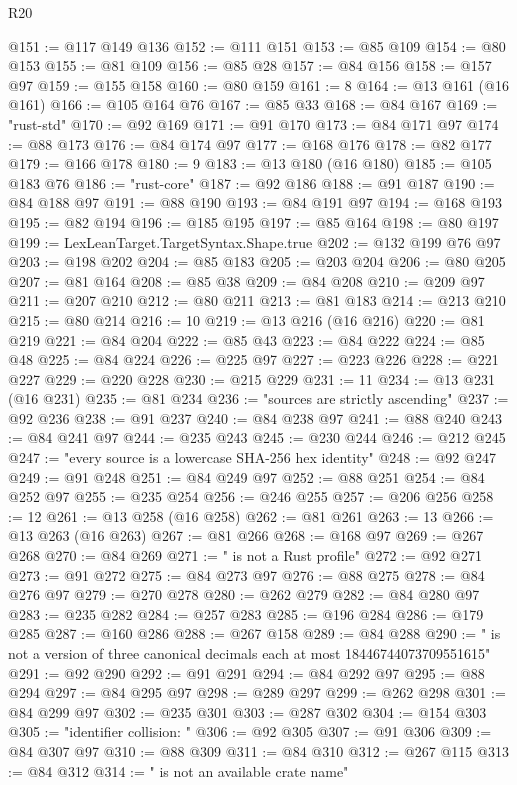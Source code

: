 \begin{lexlean}{R20}
\begin{coremodule}
@151 := @117 @149 @136
@152 := @111 @151
@153 := @85 @109
@154 := @80 @153
@155 := @81 @109
@156 := @85 @28
@157 := @84 @156
@158 := @157 @97
@159 := @155 @158
@160 := @80 @159
@161 := 8
@164 := @13 @161 (@16 @161)
@166 := @105 @164 @76
@167 := @85 @33
@168 := @84 @167
@169 := "rust-std"
@170 := @92 @169
@171 := @91 @170
@173 := @84 @171 @97
@174 := @88 @173
@176 := @84 @174 @97
@177 := @168 @176
@178 := @82 @177
@179 := @166 @178
@180 := 9
@183 := @13 @180 (@16 @180)
@185 := @105 @183 @76
@186 := "rust-core"
@187 := @92 @186
@188 := @91 @187
@190 := @84 @188 @97
@191 := @88 @190
@193 := @84 @191 @97
@194 := @168 @193
@195 := @82 @194
@196 := @185 @195
@197 := @85 @164
@198 := @80 @197
@199 := LexLeanTarget.TargetSyntax.Shape.true
@202 := @132 @199 @76 @97
@203 := @198 @202
@204 := @85 @183
@205 := @203 @204
@206 := @80 @205
@207 := @81 @164
@208 := @85 @38
@209 := @84 @208
@210 := @209 @97
@211 := @207 @210
@212 := @80 @211
@213 := @81 @183
@214 := @213 @210
@215 := @80 @214
@216 := 10
@219 := @13 @216 (@16 @216)
@220 := @81 @219
@221 := @84 @204
@222 := @85 @43
@223 := @84 @222
@224 := @85 @48
@225 := @84 @224
@226 := @225 @97
@227 := @223 @226
@228 := @221 @227
@229 := @220 @228
@230 := @215 @229
@231 := 11
@234 := @13 @231 (@16 @231)
@235 := @81 @234
@236 := "sources are strictly ascending"
@237 := @92 @236
@238 := @91 @237
@240 := @84 @238 @97
@241 := @88 @240
@243 := @84 @241 @97
@244 := @235 @243
@245 := @230 @244
@246 := @212 @245
@247 := "every source is a lowercase SHA-256 hex identity"
@248 := @92 @247
@249 := @91 @248
@251 := @84 @249 @97
@252 := @88 @251
@254 := @84 @252 @97
@255 := @235 @254
@256 := @246 @255
@257 := @206 @256
@258 := 12
@261 := @13 @258 (@16 @258)
@262 := @81 @261
@263 := 13
@266 := @13 @263 (@16 @263)
@267 := @81 @266
@268 := @168 @97
@269 := @267 @268
@270 := @84 @269
@271 := " is not a Rust profile"
@272 := @92 @271
@273 := @91 @272
@275 := @84 @273 @97
@276 := @88 @275
@278 := @84 @276 @97
@279 := @270 @278
@280 := @262 @279
@282 := @84 @280 @97
@283 := @235 @282
@284 := @257 @283
@285 := @196 @284
@286 := @179 @285
@287 := @160 @286
@288 := @267 @158
@289 := @84 @288
@290 := " is not a version of three canonical decimals each at most 18446744073709551615"
@291 := @92 @290
@292 := @91 @291
@294 := @84 @292 @97
@295 := @88 @294
@297 := @84 @295 @97
@298 := @289 @297
@299 := @262 @298
@301 := @84 @299 @97
@302 := @235 @301
@303 := @287 @302
@304 := @154 @303
@305 := "identifier collision: "
@306 := @92 @305
@307 := @91 @306
@309 := @84 @307 @97
@310 := @88 @309
@311 := @84 @310
@312 := @267 @115
@313 := @84 @312
@314 := " is not an available crate name"

\end{coremodule}
\end{lexlean}
